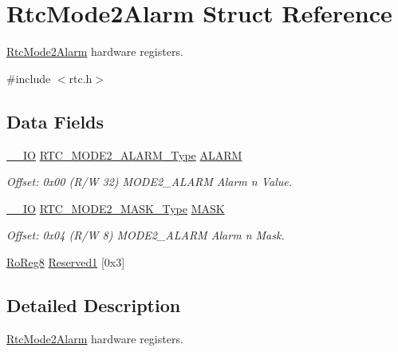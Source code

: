 \hypertarget{struct_rtc_mode2_alarm}{}\section{Rtc\+Mode2\+Alarm Struct Reference}
\label{struct_rtc_mode2_alarm}


\mbox{\hyperlink{struct_rtc_mode2_alarm}{Rtc\+Mode2\+Alarm}} hardware registers.  




{\ttfamily \#include $<$rtc.\+h$>$}

\subsection*{Data Fields}
\begin{DoxyCompactItemize}
\item 
\mbox{\hyperlink{core__cm0plus_8h_aec43007d9998a0a0e01faede4133d6be}{\+\_\+\+\_\+\+IO}} \mbox{\hyperlink{union_r_t_c___m_o_d_e2___a_l_a_r_m___type}{R\+T\+C\+\_\+\+M\+O\+D\+E2\+\_\+\+A\+L\+A\+R\+M\+\_\+\+Type}} \mbox{\hyperlink{struct_rtc_mode2_alarm_a8a3b16e9cc201839a169154d46a636d4}{A\+L\+A\+RM}}
\begin{DoxyCompactList}\small\item\em Offset\+: 0x00 (R/W 32) M\+O\+D\+E2\+\_\+\+A\+L\+A\+RM Alarm n Value. \end{DoxyCompactList}\item 
\mbox{\hyperlink{core__cm0plus_8h_aec43007d9998a0a0e01faede4133d6be}{\+\_\+\+\_\+\+IO}} \mbox{\hyperlink{union_r_t_c___m_o_d_e2___m_a_s_k___type}{R\+T\+C\+\_\+\+M\+O\+D\+E2\+\_\+\+M\+A\+S\+K\+\_\+\+Type}} \mbox{\hyperlink{struct_rtc_mode2_alarm_a2eafb97c42d3714baac1a2528aade5c0}{M\+A\+SK}}
\begin{DoxyCompactList}\small\item\em Offset\+: 0x04 (R/W 8) M\+O\+D\+E2\+\_\+\+A\+L\+A\+RM Alarm n Mask. \end{DoxyCompactList}\item 
\mbox{\hyperlink{group___s_a_m_d21_e15_a__definitions_ga0d957f1433aaf5d70e4dc2b68288442d}{Ro\+Reg8}} \mbox{\hyperlink{struct_rtc_mode2_alarm_a0ec4ccebd5bfbf4f17510e15a5a9ff81}{Reserved1}} \mbox{[}0x3\mbox{]}
\end{DoxyCompactItemize}


\subsection{Detailed Description}
\mbox{\hyperlink{struct_rtc_mode2_alarm}{Rtc\+Mode2\+Alarm}} hardware registers. 

